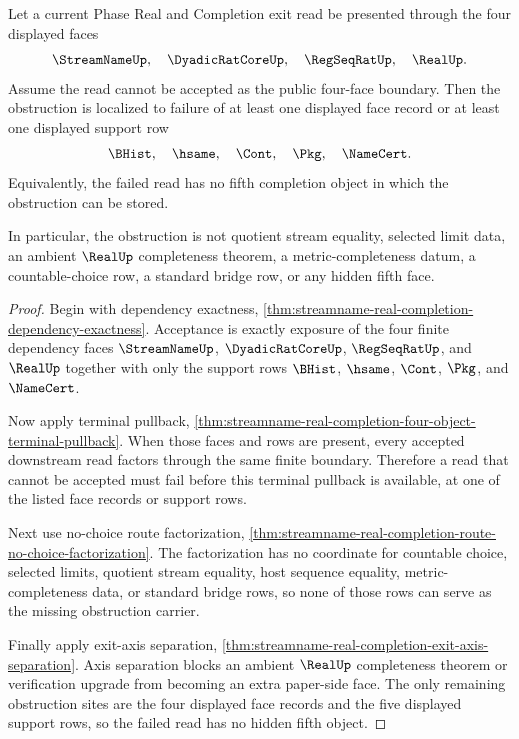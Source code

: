 \begin{theorem}
\label{thm:streamname-real-completion-failure-localization}
Let a current Phase Real and Completion exit read be presented through the four displayed faces
$$
\StreamNameUp,\quad \DyadicRatCoreUp,\quad \RegSeqRatUp,\quad \RealUp.
$$
Assume the read cannot be accepted as the public four-face boundary. Then the obstruction is localized to failure of at least one displayed face record or at least one displayed support row
$$
\BHist,\quad \hsame,\quad \Cont,\quad \Pkg,\quad \NameCert.
$$
Equivalently, the failed read has no fifth completion object in which the obstruction can be stored.

In particular, the obstruction is not quotient stream equality, selected limit data, an ambient $\RealUp$ completeness theorem, a metric-completeness datum, a countable-choice row, a standard bridge row, or any hidden fifth face.
\end{theorem}
\begin{proof}
Begin with dependency exactness, \autoref{thm:streamname-real-completion-dependency-exactness}. Acceptance is exactly exposure of the four finite dependency faces $\StreamNameUp$, $\DyadicRatCoreUp$, $\RegSeqRatUp$, and $\RealUp$ together with only the support rows $\BHist$, $\hsame$, $\Cont$, $\Pkg$, and $\NameCert$.

Now apply terminal pullback, \autoref{thm:streamname-real-completion-four-object-terminal-pullback}. When those faces and rows are present, every accepted downstream read factors through the same finite boundary. Therefore a read that cannot be accepted must fail before this terminal pullback is available, at one of the listed face records or support rows.

Next use no-choice route factorization, \autoref{thm:streamname-real-completion-route-no-choice-factorization}. The factorization has no coordinate for countable choice, selected limits, quotient stream equality, host sequence equality, metric-completeness data, or standard bridge rows, so none of those rows can serve as the missing obstruction carrier.

Finally apply exit-axis separation, \autoref{thm:streamname-real-completion-exit-axis-separation}. Axis separation blocks an ambient $\RealUp$ completeness theorem or verification upgrade from becoming an extra paper-side face. The only remaining obstruction sites are the four displayed face records and the five displayed support rows, so the failed read has no hidden fifth object.
\end{proof}

